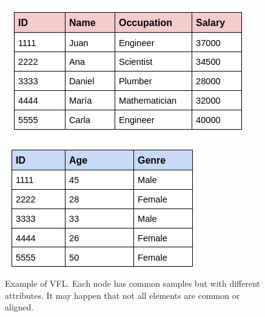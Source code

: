 \begin{figure}[h]
    \centering
    \begin{minipage}{0.40\textwidth}
        \centering
        \includegraphics[width=\textwidth]{figures/2-Federated_Learning/VFL_1.png} %
    \end{minipage}\hspace*{2.5 em}
    \begin{minipage}{0.32\textwidth}
        \centering
        \includegraphics[width=\textwidth]{figures/2-Federated_Learning/VFL_2.png} %
    \end{minipage}
    \caption{Example of VFL. Each node has common samples but with different attributes. It may happen that not all elements are common or aligned.}
    \label{fig:VFL}
\end{figure}

